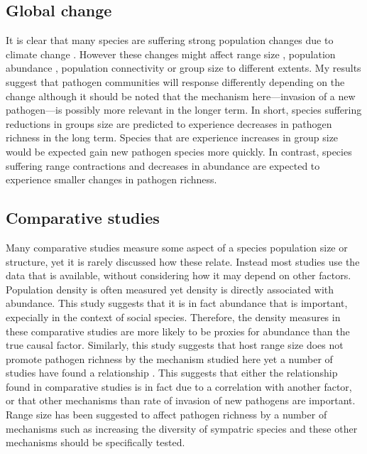 \subsection{Global change}

It is clear that many species are suffering strong population changes due to climate change \cite{thomas2004extinction}.
However these changes might affect range size \cite{thomas2004extinction}, population abundance \cite{craigie2010large}, population connectivity \cite{} or group size \cite{lehmann2010apes, zunino2007habitat, manor2003impact, atwood2006influence} to different extents.
My results suggest that pathogen communities will response differently depending on the change although it should be noted that the mechanism here---invasion of a new pathogen---is possibly more relevant in the longer term.
In short, species suffering reductions in groups size \cite{lehmann2010apes, zunino2007habitat, manor2003impact, atwood2006influence} are predicted to experience decreases in pathogen richness in the long term.
Species that are experience increases in group size \cite{lehmann2010apes} would be expected gain new pathogen species more quickly.
In contrast, species suffering range contractions \cite{thomas2004extinction} and decreases in abundance \cite{craigie2010large} are expected to experience smaller changes in pathogen richness.


\subsection{Comparative studies}

Many comparative studies measure some aspect of a species population size or structure, yet it is rarely discussed how these relate.
Instead most studies use the data that is available, without considering how it may depend on other factors.
Population density is often measured \cite{morand1998density, lindenfors2007parasite, nunn2003comparative, arneberg2002host} yet density is directly associated with abundance.
This study suggests that it is in fact abundance that is important, expecially in the context of social species.
Therefore, the density measures in these comparative studies are more likely to be proxies for abundance than the true causal factor.
Similarly, this study suggests that host range size does not promote pathogen richness by the mechanism studied here yet a number of studies have found a relationship \cite{kamiya2014determines, nunn2003comparative}.
This suggests that either the relationship found in comparative studies is in fact due to a correlation with another factor, or that other mechanisms than rate of invasion of new pathogens are important.
Range size has been suggested to affect pathogen richness by a number of mechanisms such as increasing the diversity of sympatric species and these other mechanisms should be specifically tested.

